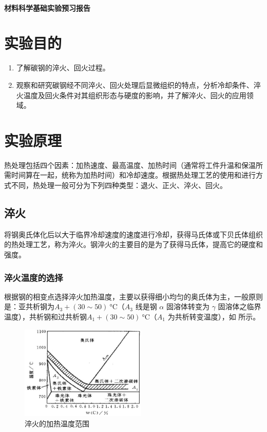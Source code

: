 \documentclass[a4paper,utf8]{article}
\begin{document}
\begin{center}
    {\mbox{}\\[7em]\bfseries\songti%
    材料科学基础实验预习报告}\\[34mm]
    \pointingbox
\end{center}\newpage
\section{实验目的}
    \begin{enumerate}
        \item 了解碳钢的淬火、回火过程。
        \item 观察和研究碳钢经不同淬火、回火处理后显微组织的特点，分析冷却条件、淬火温度及回火条件对其组织形态与硬度的影响，并了解淬火、回火的应用领域。
    \end{enumerate}
\section{实验原理}%
    热处理包括四个因素：加热速度、最高温度、加热时间（通常将工件升温和保温所需时间算在一起，统称为加热时间）和冷却速度。根据热处理工艺的使用和进行方式不同，热处理一般可分为下列四种类型：退火、正火、淬火、回火。\par
    \subsection{淬火}
        将钢奥氏体化后以大于临界冷却速度的速度进行冷却，获得马氏体或下贝氏体组织的热处理工艺，称为淬火。钢淬火的主要目的是为了获得马氏体，提高它的硬度和强度。
        \subsubsection{淬火温度的选择}
            根据钢的相变点选择淬火加热温度，主要以获得细小均匀的奥氏体为主，一般原则是：亚共析钢为$A_{3}+(30{\sim}50)~\unit{\degreeCelsius}$（$A_3$ 线是钢 $\alpha$ 固溶体转变为 $\gamma$ 固溶体之临界温度），共析钢和过共析钢$A_{1}+(30{\sim}50)~\unit{\degreeCelsius}$（$A_1$ 为共析转变温度），如 所示。
            \begin{figure}[!ht]
                \caption{淬火的加热温度范围\label{fig:1}}
                \includegraphics[width=60mm]{fig1.jpg}
            \end{figure}
\end{document}
